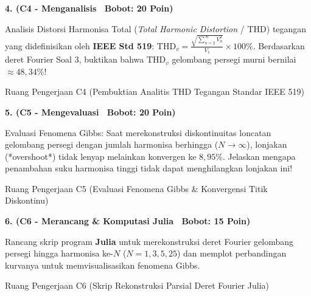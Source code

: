 \documentclass[10pt,a4paper]{article}
\begin{document}
\newpage

\noindent\textbf{4. (C4 - Menganalisis \textbar\ Bobot: 20 Poin)}\par\vspace{0.5mm}
{\footnotesize Analisis Distorsi Harmonisa Total (\textit{Total Harmonic Distortion} / THD) tegangan yang didefinisikan oleh \textbf{IEEE Std 519}: $\text{THD}_v = \frac{\sqrt{\sum_{n=2}^\infty V_n^2}}{V_1} \times 100\%$. Berdasarkan deret Fourier Soal 3, buktikan bahwa $\text{THD}_v$ gelombang persegi murni bernilai $\approx 48{,}34\%$!}
\begin{answerbox}{Ruang Pengerjaan C4 (Pembuktian Analitis THD Tegangan Standar IEEE 519)}
  \vspace{3.8cm}
\end{answerbox}

\vspace{1.5mm}

\noindent\textbf{5. (C5 - Mengevaluasi \textbar\ Bobot: 20 Poin)}\par\vspace{0.5mm}
{\footnotesize Evaluasi Fenomena Gibbs: Saat merekonstruksi diskontinuitas loncatan gelombang persegi dengan jumlah harmonisa berhingga ($N \to \infty$), lonjakan (*overshoot*) tidak lenyap melainkan konvergen ke $8{,}95\%$. Jelaskan mengapa penambahan suku harmonisa tinggi tidak dapat menghilangkan lonjakan ini!}
\begin{answerbox}{Ruang Pengerjaan C5 (Evaluasi Fenomena Gibbs \& Konvergensi Titik Diskontinu)}
  \vspace{3.8cm}
\end{answerbox}

\vspace{1.5mm}

\noindent\textbf{6. (C6 - Merancang \& Komputasi Julia \textbar\ Bobot: 15 Poin)}\par\vspace{0.5mm}
{\footnotesize Rancang skrip program \textbf{Julia} untuk merekonstruksi deret Fourier gelombang persegi hingga harmonisa ke-$N$ ($N=1, 3, 5, 25$) dan memplot perbandingan kurvanya untuk memvisualisasikan fenomena Gibbs.}
\begin{answerbox}{Ruang Pengerjaan C6 (Skrip Rekonstruksi Parsial Deret Fourier Julia)}
  \vspace{3.8cm}
\end{answerbox}

\vspace{1.5mm}
\end{document}
